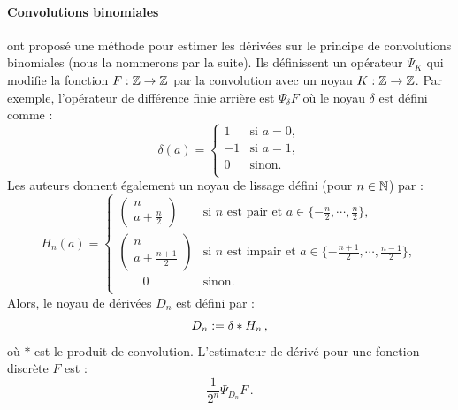 \paragraph{Convolutions binomiales}
%
 ont proposé une méthode pour estimer les
dérivées sur le principe de convolutions binomiales (nous la nommerons \BC par
la suite). Ils définissent un opérateur $\Psi_K$ qui modifie la fonction $F : \mathbb{Z}
\rightarrow \mathbb{Z}$ par la convolution avec un noyau $K : \mathbb{Z} \rightarrow \mathbb{Z}$. Par
exemple, l'opérateur de différence finie arrière est $\Psi_\delta F$ où le noyau
$\delta$ est défini comme :
%
\begin{equation}
    \delta(a) =
      \begin{cases}
        1   & \text{si } a = 0,\\
        -1  & \text{si } a = 1,\\
        0   & \text{sinon}.\\
      \end{cases}
\end{equation}
%
Les auteurs donnent également un noyau de lissage défini (pour $n \in \mathbb{N}$) par :
%
\begin{equation}
  H_n(a) =
    \begin{cases}
      \left(\!
        \begin{array}{c}
          n \\
          a + \frac{n}{2}
        \end{array}
        \!\right)   & \text{si } n \text{ est pair et } a \in \{ -\frac{n}{2} , \cdots, \frac{n}{2} \},\\
        \left(\!
          \begin{array}{c}
            n \\
            a + \frac{n + 1}{2}
          \end{array}
          \!\right)   & \text{si } n \text{ est impair et } a \in \{ -\frac{n + 1}{2}, \cdots, \frac{n - 1}{2} \},\\
      \quad\quad 0   & \text{sinon}.\\
    \end{cases}
\end{equation}
%
Alors, le noyau de dérivées $D_n$ est défini par :
%
\begin{equation}
  D_n := \delta \ast H_n \,,
\end{equation}
%
où $\ast$ est le produit de convolution. L'estimateur de dérivé pour une fonction discrète $F$ est :
%
\begin{equation}
  \frac{1}{2^n}\Psi_{D_n}F \,.
\end{equation}
